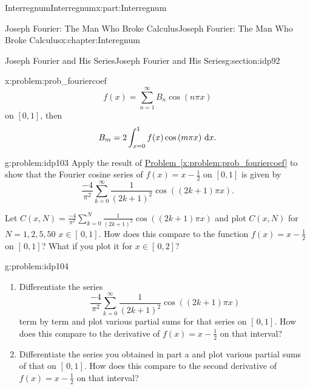 \documentclass[oneside,10pt,]{book}
\newcommand{\xreffont}{\relax}
\numberwithin{equation}{section}
\newcommand{\dx}[1]{\,{\rm d}#1}
\begin{document}
\begin{partptx}{Interregnum}{}{Interregnum}{}{}{x:part:Interregnum}
\begin{chapterptx}{Joseph Fourier: The Man Who Broke Calculus}{}{Joseph Fourier: The Man Who Broke Calculus}{}{}{x:chapter:Interegnum}
\begin{sectionptx}{Joseph Fourier and His Series}{}{Joseph Fourier and His Series}{}{}{g:section:idp92}
\begin{problem}{}{x:problem:prob_fouriercoef}
\begin{equation*}
f(x)=\sum_{n=1}^\infty B_n\cos\left(n\pi x\right)
\end{equation*}
on \([0,1]\), then%
\begin{equation*}
B_m=2\int_{x=0}^1f(x)\cos\left(m\pi x\right)\dx{ x}.{}
\end{equation*}
%
\end{problem}
\begin{problem}{}{g:problem:idp103}%
 Apply the result of \hyperref[x:problem:prob_fouriercoef]{Problem~{\xreffont\ref{x:problem:prob_fouriercoef}}} to show that the Fourier cosine series of \(f(x)=x-\frac{1}{2}\) on \([0,1]\) is given by%
\begin{equation*}
\frac{-4}{\pi^2}\sum_{k=0}^\infty\frac{1}{\left(2k+1\right)^2}\cos \left((2k+1)\pi x\right)\text{.}
\end{equation*}
%
\par
Let \(C(x,N)=\frac{-4}{\pi^2}\sum_{k=0}^N\frac{1}{\left(2k+1\right)^2}\cos \left((2k+1)\pi x\right)\) and plot \(C(x,N)\) for \(N=1,2,5,50\) \(x\in[\,0,1]\). How does this compare to the function \(f(x)=x-\frac{1}{2}\) on \([\,0,1]\)? What if you plot it for \(x\in[\,0,2]?\)%
\end{problem}
\begin{problem}{}{g:problem:idp104}%
\begin{enumerate}[font=\bfseries,label=(\alph*),ref=\alph*]
\item{}Differentiate the series%
\begin{equation*}
\frac{-4}{\pi^2}\sum_{k=0}^\infty\frac{1}{\left(2k+1\right)^2}\cos \left((2k+1)\pi x\right)
\end{equation*}
term by term and plot various partial sums for that series on \([\,0,1]\). How does this compare to the derivative of \(f(x)=x-\frac{1}{2}\) on that interval?%
\item{}Differentiate the series you obtained in part a and plot various partial sums of that on \([\,0,1]\). How does this compare to the second derivative of \(f(x)=x-\frac{1}{2}\) on that interval?%
\end{enumerate}
\end{problem}
\end{sectionptx}
\end{chapterptx}
\end{partptx}
%
%
\typeout{************************************************}
\end{document}
